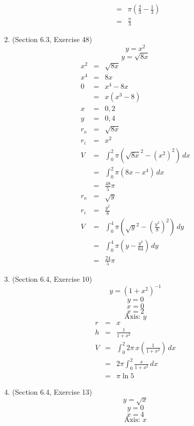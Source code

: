 \documentclass{article}
\begin{document}
\begin{enumerate}
\begin{eqnarray}
              &=& \pi\left(\frac{2}{3} - \frac{1}{3}\right) \\
              &=& \frac{\pi}{3}
        \end{eqnarray}
    \item (Section 6.3, Exercise 48)
        $$y = x^2$$
        $$y = \sqrt{8x}$$
        \begin{eqnarray}
            x^2 &=& \sqrt{8x} \\
            x^4 &=& 8x \\
            0 &=& x^4 - 8x \\
              &=& x\left(x^3 - 8\right) \\
            x &=& 0, 2 \\
            y &=& 0, 4 \\
            r_o &=& \sqrt{8x} \\
            r_i &=& x^2 \\
            V &=& \int_0^2{\pi\left(\sqrt{8x}^2 - \left(x^2\right)^2\right)\,dx} \\
              &=& \int_0^2{\pi\left(8x - x^4\right)\,dx} \\
              &=& \frac{48}{5}\pi \\
            r_o &=& \sqrt{y} \\
            r_i &=& \frac{y^2}{8} \\
            V &=& \int_0^4{\pi\left(\sqrt{y}^2 - \left(\frac{y^2}{8}\right)^2\right)\,dy} \\
              &=& \int_0^4{\pi\left(y - \frac{y^4}{64}\right)\,dy} \\
              &=& \frac{24}{5}\pi
        \end{eqnarray}
    \item (Section 6.4, Exercise 10)
        $$y = \left(1 + x^2\right)^{-1}$$
        $$y = 0$$
        $$x = 0$$
        $$x = 2$$
        $$\text{Axis: } y$$
        \begin{eqnarray}
            r &=& x \\
            h &=& \frac{1}{1 + x^2} \\
            V &=& \int_0^2{2\pi\,x\left(\frac{1}{1 + x^2}\right)\,dx} \\
              &=& 2\pi\int_0^2{\frac{x}{1 + x^2}\,dx} \\
              &=& \pi\ln{5}
        \end{eqnarray}
    \item (Section 6.4, Exercise 13)
        $$y = \sqrt{x}$$
        $$y = 0$$
        $$x = 4$$
        $$\text{Axis: } x$$

\end{enumerate}
\end{document}
